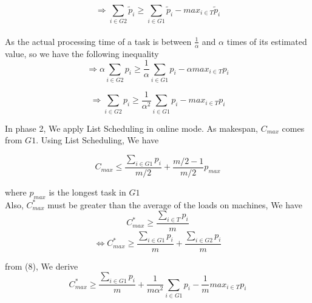\documentclass[10pt, conference, compsocconf]{IEEEtran}
\begin{document}
\begin{equation}\nonumber 
\Rightarrow \sum_{i \in G2 }^{}{\tilde p_{i}} \geq \sum_{i \in G1 }^{}{\tilde p_{i}} - {max_{i \in T}}{\tilde p_{i}}\end{equation}
\\
As the actual processing time of a task is between $\frac{1}{\alpha}$ and $\alpha$ times of its estimated value, so we have the following inequality\\
\begin{equation}\nonumber 
\Rightarrow \alpha\sum_{i \in G2 }^{}{{p_{i}}} \geq  {\frac{1}{\alpha}} \sum_{i \in G1 }^{}{{p_{i}}} - \alpha {max_{i \in T}}{{p_{i}}}
\end{equation}

\begin{equation}
\Rightarrow \sum_{i \in G2 }^{}{{p_{i}}} \geq {\frac{1}{\alpha^{2}}} \sum_{i \in G1 }^{}{{p_{i}}} - {max_{i \in T}}{{p_{i}}}
\end{equation}




In phase 2, We  apply List Scheduling in online mode. As makespan, $C_{max}$ comes from $G1$. Using List Scheduling, We have

\begin{equation}
 C_{max} \leq \frac{\sum_{i \in G1 }^{}{{p_{i}}}}{m/2} + {\frac{m/2-1}{m/2}} p_{max} 
\end{equation}

where $p_{max}$ is the longest task in $G1$
\\

Also, $C_{max}^{*}$ must be greater than the average of the  loads on  machines, We have\\

\begin{equation}\nonumber 
C_{max}^{*} \geq  \frac{\sum_{i \in T }^{}{{p_{i}}}}{m}
\end{equation}
\begin{equation}\nonumber
\Leftrightarrow C_{max}^{*}\geq  \frac{\sum_{i \in G1 }^{}{{p_{i}}}}{m} + \frac{\sum_{i \in G2 }^{}{{p_{i}}}}{m} \end{equation}

from (8), We derive\\
\begin{equation}\nonumber
C_{max}^{*} \geq  \frac{\sum_{i \in G1 }^{}{{p_{i}}}}{m} + {\frac{1}{m\alpha^{2}}} \sum_{i \in G1 }^{}{{p_{i}}} - {\frac{1}{m}}{max_{i \in T}}{{p_{i}}} 
\end{equation}
\end{document}
